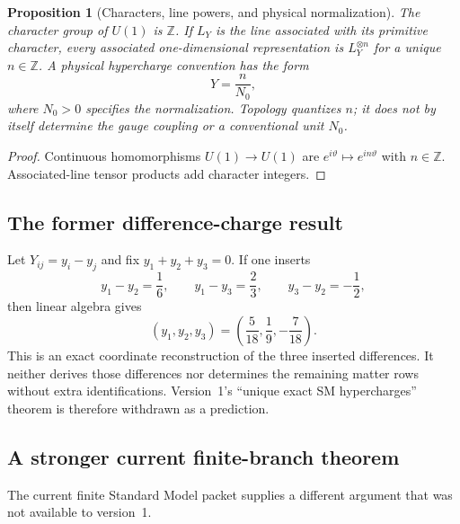 \documentclass[11pt]{article}
\theoremstyle{plain}
\newtheorem{proposition}[theorem]{Proposition}
\theoremstyle{definition}
\theoremstyle{remark}
\newcommand{\Z}{\mathbb{Z}}
\begin{document}
\begin{proposition}[Characters, line powers, and physical normalization]
\label{prop:charge-lattice}
The character group of $U(1)$ is $\Z$. If $L_Y$ is the line associated with its
primitive character, every associated one-dimensional representation is
$L_Y^{\otimes n}$ for a unique $n\in\Z$. A physical hypercharge convention has
the form
\begin{equation}
 Y=\frac{n}{N_0},
 \label{eq:charge-normalization}
\end{equation}
where $N_0>0$ specifies the normalization. Topology quantizes $n$; it does not
by itself determine the gauge coupling or a conventional unit $N_0$.
\end{proposition}

\begin{proof}
Continuous homomorphisms $U(1)\to U(1)$ are
$e^{i\vartheta}\mapsto e^{in\vartheta}$ with $n\in\Z$. Associated-line tensor
products add character integers.
\end{proof}

\subsection{The former difference-charge result}

Let $Y_{ij}=y_i-y_j$ and fix $y_1+y_2+y_3=0$. If one inserts
\[
 y_1-y_2=\frac16,\qquad
 y_1-y_3=\frac23,\qquad
 y_3-y_2=-\frac12,
\]
then linear algebra gives
\[
 (y_1,y_2,y_3)=\left(\frac5{18},\frac19,-\frac7{18}\right).
\]
This is an exact coordinate reconstruction of the three inserted differences.
It neither derives those differences nor determines the remaining matter rows
without extra identifications. Version~1's ``unique exact SM hypercharges''
theorem is therefore withdrawn as a prediction.

\subsection{A stronger current finite-branch theorem}

The current finite Standard Model packet supplies a different argument that was
not available to version~1.
\end{document}
